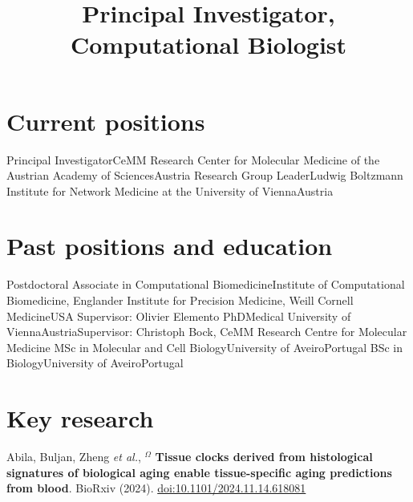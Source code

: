\documentclass[11pt,a4paper,roman]{moderncv} %
\title{Principal Investigator, \newline Computational Biologist}
\begin{document}
\makecvtitle %


\section{Current positions}
        {Principal Investigator}{\newline{}CeMM Research Center for Molecular Medicine of the Austrian Academy of Sciences}{Austria}
        {}{}
        {Research Group Leader}{\newline{}Ludwig Boltzmann Institute for Network Medicine at the University of Vienna}{Austria}
        {}{}



\section{Past positions and education}
        {Postdoctoral Associate in Computational Biomedicine}{Institute of Computational Biomedicine, Englander Institute for Precision Medicine, Weill Cornell Medicine}{USA}
        {}{Supervisor: Olivier Elemento}
        {PhD}{Medical University of Vienna}{Austria}{}{Supervisor: Christoph Bock, CeMM Research Centre for Molecular Medicine}
        {MSc in Molecular and Cell Biology}{University of Aveiro}{Portugal}{}{}
        {BSc in Biology}{University of Aveiro}{Portugal}{}{}




\section{Key research}
        {Abila, Buljan, Zheng \textit{et al.}, $^\Omega$ \textbf{Tissue clocks derived from histological signatures of biological aging enable tissue-specific aging predictions from blood}. BioRxiv (2024). \href{https://doi.org/10.1101/2024.11.14.618081}{doi:10.1101/2024.11.14.618081}}
\end{document}
